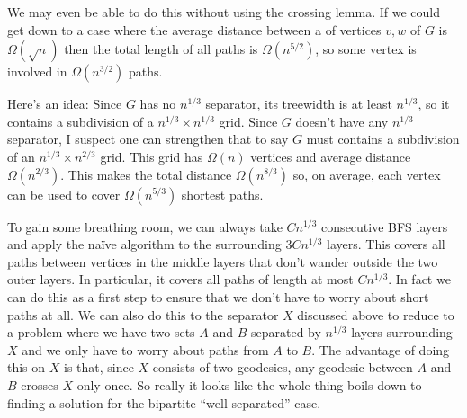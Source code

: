 \documentclass{patmorin}
\DeclareMathOperator{\diam}{diam}
\begin{document}
We may even be able to do this without using the crossing lemma.  If we could get down to a case where the average distance between a of vertices $v,w$ of $G$ is $\Omega(\sqrt{n})$ then the total length of all paths is $\Omega(n^{5/2})$, so some vertex is involved in $\Omega(n^{3/2})$ paths.


Here's an idea: Since $G$ has no $n^{1/3}$ separator, its treewidth is at least $n^{1/3}$, so it contains a subdivision of a $n^{1/3}\times n^{1/3}$ grid.  Since $G$ doesn't have any $n^{1/3}$ separator, I suspect one can strengthen that to say $G$ must contains a subdivision of an $n^{1/3}\times n^{2/3}$ grid.  This grid has $\Omega(n)$ vertices and average distance $\Omega(n^{2/3})$.  This makes the total distance $\Omega(n^{8/3})$ so, on average, each vertex can be used to cover $\Omega(n^{5/3})$ shortest paths.

%

To gain some breathing room, we can always take $C n^{1/3}$ consecutive BFS layers and apply the naïve algorithm to the surrounding $3Cn^{1/3}$ layers.  This covers all paths between vertices in the middle layers that don't wander outside the two outer layers. In particular, it covers all paths of length at most $Cn^{1/3}$.  In fact we can do this as a first step to ensure that we don't have to worry about short paths at all.  We can also do this to the separator $X$ discussed above to reduce to a problem where we have two sets $A$ and $B$ separated by $n^{1/3}$ layers surrounding $X$ and we only have to worry about paths from $A$ to $B$.  The advantage of doing this on $X$ is that, since $X$ consists of two geodesics, any geodesic between $A$ and $B$ crosses $X$ only once.  So really it looks like the whole thing boils down to finding a solution for the bipartite ``well-separated'' case.
\end{document}
